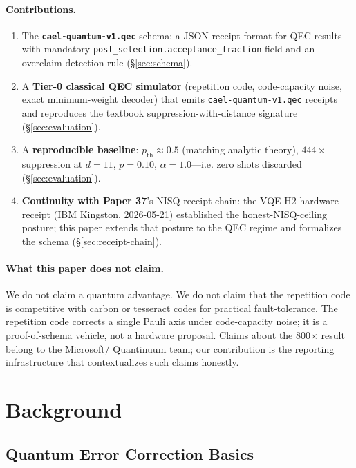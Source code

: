 \documentclass[conference]{IEEEtran}
\newcommand{\pth}{p_{\mathrm{th}}}  %
\newcommand{\af}{\alpha}            %
\begin{document}
\paragraph{Contributions.}
\begin{enumerate}
  \item The \textbf{\texttt{cael-quantum-v1.qec}} schema: a JSON receipt
    format for QEC results with mandatory \texttt{post\_selection.acceptance\_fraction}
    field and an overclaim detection rule (\S\ref{sec:schema}).
  \item A \textbf{Tier-0 classical QEC simulator} (repetition code,
    code-capacity noise, exact minimum-weight decoder) that emits
    \texttt{cael-quantum-v1.qec} receipts and reproduces the textbook
    suppression-with-distance signature (\S\ref{sec:evaluation}).
  \item A \textbf{reproducible baseline}: $\pth \approx 0.5$ (matching
    analytic theory), $444\times$ suppression at $d{=}11$, $p{=}0.10$,
    $\af{=}1.0$---i.e. zero shots discarded (\S\ref{sec:evaluation}).
  \item \textbf{Continuity with Paper 37}'s NISQ receipt chain: the VQE
    H2 hardware receipt (IBM Kingston, 2026-05-21) established the
    honest-NISQ-ceiling posture; this paper extends that posture to the
    QEC regime and formalizes the schema (\S\ref{sec:receipt-chain}).
\end{enumerate}

\paragraph{What this paper does not claim.}
We do not claim a quantum advantage. We do not claim that the repetition
code is competitive with carbon or tesseract codes for practical
fault-tolerance. The repetition code corrects a single Pauli axis under
code-capacity noise; it is a proof-of-schema vehicle, not a hardware
proposal. Claims about the 800$\times$ result belong to the Microsoft/
Quantinuum team; our contribution is the reporting infrastructure that
contextualizes such claims honestly.

\section{Background}
\label{sec:background}

\subsection{Quantum Error Correction Basics}
\end{document}
